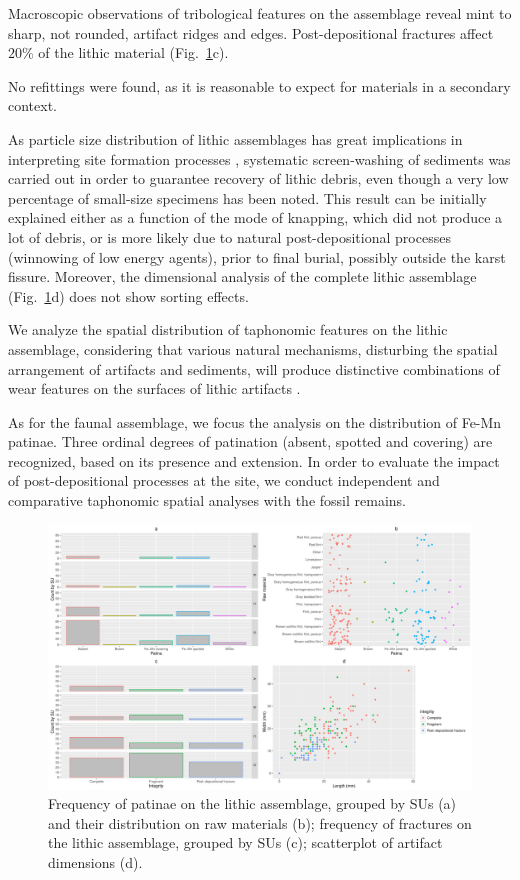 \documentclass[review,authoryear]{elsarticle} %
\begin{document}
Macroscopic observations of tribological features on the assemblage reveal mint to sharp, not rounded, artifact ridges and edges. Post-depositional fractures affect $20\%$ of the lithic material (Fig.~\ref{fig:2}c).

No refittings were found, as it is reasonable to expect for materials in a secondary context.

As particle size distribution of lithic assemblages has great implications in interpreting site formation processes \citep{Bertran2012}, systematic screen-washing of sediments was carried out in order to guarantee recovery of lithic debris, even though a very low percentage of small-size specimens has been noted. This result can be initially explained either as a function of the mode of knapping, which did not produce a lot of debris, or is more likely due to natural post-depositional processes (winnowing of low energy agents), prior to final burial, possibly outside the karst fissure. Moreover, the dimensional analysis of the complete lithic assemblage (Fig.~\ref{fig:2}d) does not show sorting effects.

We analyze the spatial distribution of taphonomic features on the lithic assemblage, considering that various natural mechanisms, disturbing the spatial arrangement of artifacts and sediments, will produce distinctive combinations of wear features on the surfaces of lithic artifacts \citep{Burroni2002}.

As for the faunal assemblage, we focus the analysis on the distribution of Fe-Mn patinae. Three ordinal degrees of patination (absent, spotted and covering) are recognized, based on its presence and extension. In order to evaluate the impact of post-depositional processes at the site, we conduct independent and comparative taphonomic spatial analyses with the fossil remains.

\begin{figure}
  \centering
  \includegraphics[width=1\textwidth]{../artwork/Fig2.pdf}
  \caption{Frequency of patinae on the lithic assemblage, grouped by SUs (a) and their distribution on raw materials (b); frequency of fractures on the lithic assemblage, grouped by SUs (c); scatterplot of artifact dimensions (d).}
  \label{fig:2}
\end{figure}
\end{document}
